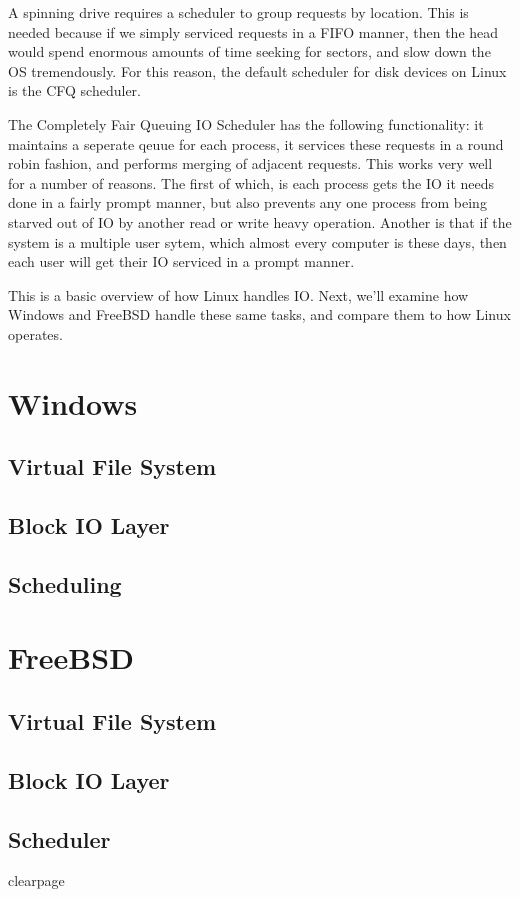 \documentclass[10pt,letterpaper,onecolumn,draftclsnofoot]{IEEEtran}
\begin{document}
  A spinning drive requires a scheduler to group requests by location. This is
  needed because if we simply serviced requests in a FIFO manner, then the head
  would spend enormous amounts of time seeking for sectors, and slow down the OS
  tremendously. For this reason, the default scheduler for disk devices on Linux
  is the CFQ scheduler.

  The Completely Fair Queuing IO Scheduler has the following functionality: it
  maintains a seperate qeuue for each process, it services these requests in a round
  robin fashion, and performs merging of adjacent requests. This works very well
  for a number of reasons. The first of which, is each process gets the IO it needs
  done in a fairly prompt manner, but also prevents any one process from being
  starved out of IO by another read or write heavy operation. Another is that
  if the system is a multiple user sytem, which almost every computer is these
  days, then each user will get their IO serviced in a prompt manner.

  This is a basic overview of how Linux handles IO. Next, we'll examine how Windows
  and FreeBSD handle these same tasks, and compare them to how Linux operates.

\section{Windows}
 \subsection{Virtual File System}
 \subsection{Block IO Layer}
 \subsection{Scheduling}
\section{FreeBSD}
 \subsection{Virtual File System}
 \subsection{Block IO Layer}
 \subsection{Scheduler}
clearpage
\end{document}
